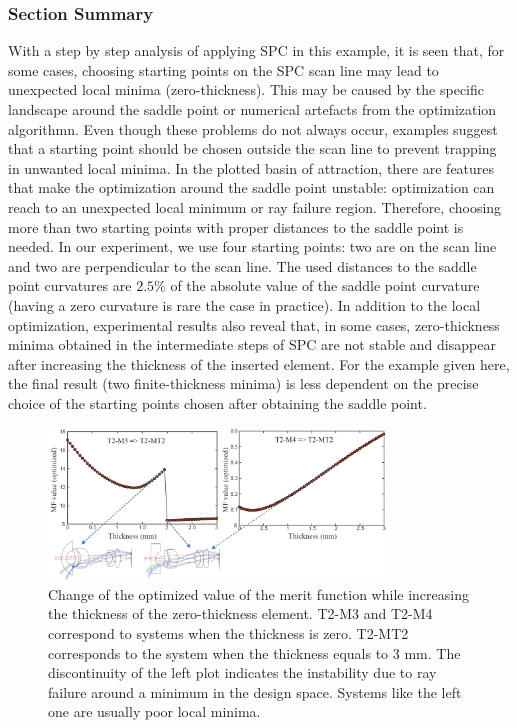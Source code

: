 \subsubsection{Section Summary}
With a step by step analysis of applying SPC in this example, it is seen that, for some cases, choosing starting points on the SPC scan line may lead to unexpected local minima (zero-thickness). This may be caused by the specific landscape around the saddle point or numerical artefacts from the optimization algorithmn. Even though these problems do not always occur, examples suggest that a starting point should be chosen outside the scan line to prevent trapping in unwanted local minima. In the plotted basin of attraction, there are features that make the optimization around the saddle point unstable: optimization can reach to an unexpected local minimum or ray failure region. Therefore, choosing more than two starting points with proper distances to the saddle point is needed. In our experiment, we use four starting points: two are on the scan line and two are perpendicular to the scan line. The used distances to the saddle point curvatures are $2.5\%$ of the absolute value of the saddle point curvature (having a zero curvature is rare the case in practice). In addition to the local optimization, experimental results also reveal that, in some cases, zero-thickness minima obtained in the intermediate steps of SPC are not stable and disappear after increasing the thickness of the inserted element. For the example given here, the final result (two finite-thickness minima) is less dependent on the precise choice of the starting points chosen after obtaining the saddle point.  

\begin{figure}[h!]
    \centering
    \includegraphics[width=0.8\textwidth]{chapter-4/figures/thickness_increase.png}
    \caption{Change of the optimized value of the merit function while increasing the thickness of the zero-thickness element. T2-M3 and T2-M4 correspond to systems when the thickness is zero. T2-MT2 corresponds to the system when the thickness equals to 3 mm. The discontinuity of the left plot indicates the instability due to ray failure around a minimum in the design space. Systems like the left one are usually poor local minima.}
    \label{fig:thickness_increase}
\end{figure}

